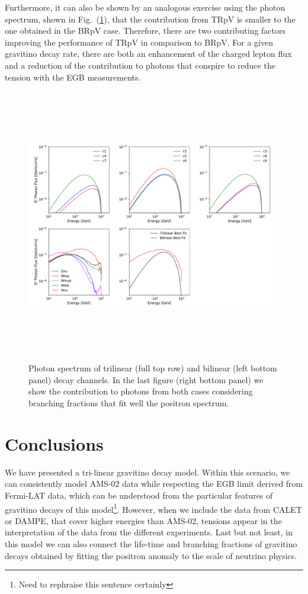 \documentclass[a4paper,11pt]{article}
\begin{document}
Furthermore, it can also be shown by an analogous exercise using the photon spectrum, shown in Fig.~(\ref{fig:photon-spectrum}), that the contribution from TRpV is smaller to the one obtained in the BRpV case. Therefore, there are two contributing factors improving the performance of TRpV in comparison to BRpV. For a given gravitino decay rate, there are both an enhancement of the charged lepton flux and a reduction of the contribution to photons that conspire to reduce the tension with the EGB measurements.

\begin{figure}[htb]
\begin{center}
\includegraphics[height=12cm,width=16cm,angle=0]{Figures/exp_plots_gamma_rays_EGB_comparison.pdf}
\caption{Photon spectrum of trilinear (full top row) and bilinear (left bottom panel) decay channels. In the last figure (right bottom panel) we show the contribution to photons from both cases considering branching fractions that fit well the positron spectrum.}
\label{fig:photon-spectrum}
\end{center}
\end{figure}

\section{Conclusions}
\label{sec:conclusions}
We have presented a tri-linear gravitino decay model. Within this scenario, we can consistently model AMS-02 data while respecting the EGB limit derived from Fermi-LAT data, which can be understood from the particular features of gravitino decays of this model\footnote{Need to rephraise this sentence certainly}. However, when we include the data from CALET or DAMPE, that cover higher energies than AMS-02, tensions appear in the interpretation of the data from the different experiments. Last but not least, in this model we can also connect the life-time and branching fractions of gravitino decays obtained by fitting the positron anomaly to the scale of neutrino physics. 
\end{document}
